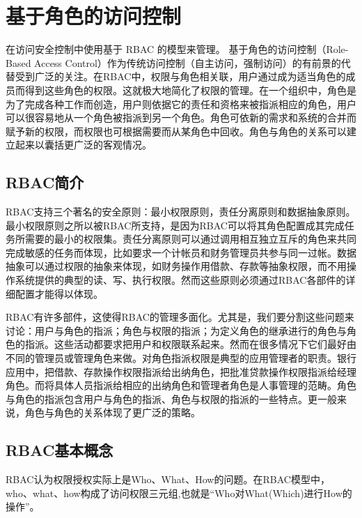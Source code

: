 
\section {基于角色的访问控制}

    \semsys 在访问安全控制中使用基于 RBAC 的模型来管理。 基于角色的访问控制（Role-Based Access Control）作为传统访问控制（自主访问，强制访问）的有前景的代替受到广泛的关注。在RBAC中，权限与角色相关联，用户通过成为适当角色的成员而得到这些角色的权限。这就极大地简化了权限的管理。在一个组织中，角色是为了完成各种工作而创造，用户则依据它的责任和资格来被指派相应的角色，用户可以很容易地从一个角色被指派到另一个角色。角色可依新的需求和系统的合并而赋予新的权限，而权限也可根据需要而从某角色中回收。角色与角色的关系可以建立起来以囊括更广泛的客观情况。

\subsection {RBAC简介}

    RBAC支持三个著名的安全原则：最小权限原则，责任分离原则和数据抽象原则。最小权限原则之所以被RBAC所支持，是因为RBAC可以将其角色配置成其完成任务所需要的最小的权限集。责任分离原则可以通过调用相互独立互斥的角色来共同完成敏感的任务而体现，比如要求一个计帐员和财务管理员共参与同一过帐。数据抽象可以通过权限的抽象来体现，如财务操作用借款、存款等抽象权限，而不用操作系统提供的典型的读、写、执行权限。然而这些原则必须通过RBAC各部件的详细配置才能得以体现。

    RBAC有许多部件，这使得RBAC的管理多面化。尤其是，我们要分割这些问题来讨论：用户与角色的指派；角色与权限的指派；为定义角色的继承进行的角色与角色的指派。这些活动都要求把用户和权限联系起来。然而在很多情况下它们最好由不同的管理员或管理角色来做。对角色指派权限是典型的应用管理者的职责。银行应用中，把借款、存款操作权限指派给出纳角色，把批准贷款操作权限指派给经理角色。而将具体人员指派给相应的出纳角色和管理者角色是人事管理的范畴。角色与角色的指派包含用户与角色的指派、角色与权限的指派的一些特点。更一般来说，角色与角色的关系体现了更广泛的策略。

\subsection {RBAC基本概念}

    RBAC认为权限授权实际上是Who、What、How的问题。在RBAC模型中，who、what、how构成了访问权限三元组,也就是“Who对What(Which)进行How的操作”。

